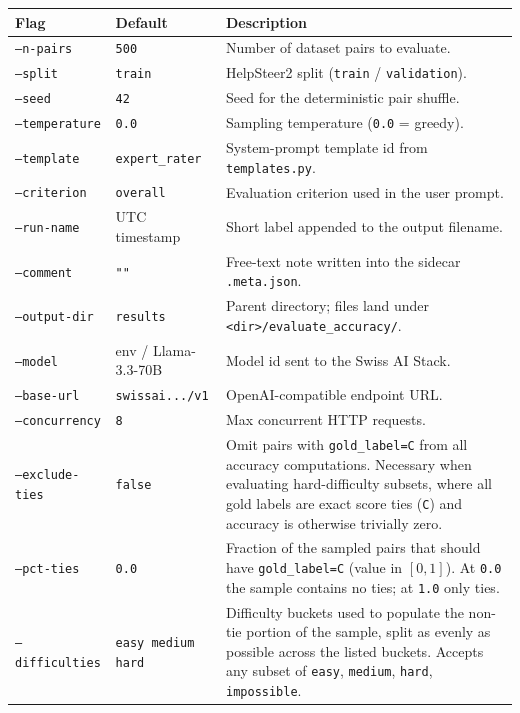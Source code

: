 \begin{longtable}{@{}llp{7.5cm}@{}}
  \toprule
  \textbf{Flag} & \textbf{Default} & \textbf{Description} \\
  \midrule \endhead
  \texttt{--n-pairs}       & \texttt{500}           & Number of dataset pairs to evaluate. \\
  \texttt{--split}         & \texttt{train}         & HelpSteer2 split (\texttt{train} / \texttt{validation}). \\
  \texttt{--seed}          & \texttt{42}            & Seed for the deterministic pair shuffle. \\
  \texttt{--temperature}   & \texttt{0.0}           & Sampling temperature (\texttt{0.0} = greedy). \\
  \texttt{--template}      & \texttt{expert\_rater} & System-prompt template id from \texttt{templates.py}. \\
  \texttt{--criterion}     & \texttt{overall}       & Evaluation criterion used in the user prompt. \\
  \texttt{--run-name}      & UTC timestamp          & Short label appended to the output filename. \\
  \texttt{--comment}       & \texttt{""}          & Free-text note written into the sidecar \texttt{.meta.json}. \\
  \texttt{--output-dir}    & \texttt{results}       & Parent directory; files land under \texttt{<dir>/evaluate\_accuracy/}. \\
  \texttt{--model}         & env / Llama-3.3-70B    & Model id sent to the Swiss AI Stack. \\
  \texttt{--base-url}      & \texttt{swissai.../v1}   & OpenAI-compatible endpoint URL. \\
  \texttt{--concurrency}   & \texttt{8}             & Max concurrent HTTP requests. \\
  \texttt{--exclude-ties}  & \texttt{false}         & Omit pairs with \texttt{gold\_label=C} from all accuracy computations. Necessary when evaluating hard-difficulty subsets, where all gold labels are exact score ties (\texttt{C}) and accuracy is otherwise trivially zero. \\
  \texttt{--pct-ties}      & \texttt{0.0}           & Fraction of the sampled pairs that should have \texttt{gold\_label=C} (value in $[0,1]$). At \texttt{0.0} the sample contains no ties; at \texttt{1.0} only ties. \\
  \texttt{--difficulties}  & \texttt{easy medium hard} & Difficulty buckets used to populate the non-tie portion of the sample, split as evenly as possible across the listed buckets. Accepts any subset of \texttt{easy}, \texttt{medium}, \texttt{hard}, \texttt{impossible}. \\

\end{longtable}
